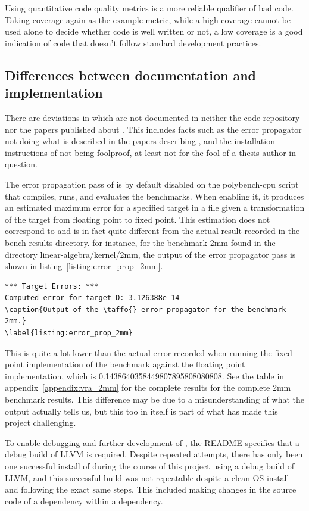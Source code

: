 Using quantitative code quality metrics is a more reliable qualifier of bad code. Taking coverage again as the example metric, while a high coverage cannot be used alone to decide whether code is well written or not, a low coverage is a good indication of code that doesn't follow standard development practices.  


\subsection{Differences between documentation and implementation}

There are deviations in \taffo{} which are not documented in neither the code repository nor the papers published about \taffo{}. 
This includes facts such as the error propagator not doing what is described in the papers describing \taffo{},  and the installation instructions of \taffo{} not being foolproof, at least not for the fool of a thesis author in question.

The error propagation pass of \taffo{} is by default disabled on the polybench-cpu script that compiles, runs, and evaluates the benchmarks. When enabling it, it produces an estimated maximum error for a specified target in a file given a transformation of the target from floating point to fixed point. This estimation does not correspond to and is in fact quite different from the actual result recorded in the bench-results directory. for instance, for the benchmark 2mm found in the directory linear-algebra/kernel/2mm, the output of the error propagator pass is shown in listing~\ref{listing:error_prop_2mm}.

\begin{lstlisting}
*** Target Errors: ***
Computed error for target D: 3.126388e-14
\caption{Output of the \taffo{} error propagator for the benchmark 2mm.}
\label{listing:error_prop_2mm}
\end{lstlisting}

This is quite a lot lower than the actual error recorded when running the fixed point implementation of the benchmark against the floating point implementation, which is 0.1438640358449807895808080808. See the table in appendix~\ref{appendix:vra_2mm} for the complete results for the complete 2mm benchmark results. This difference may be due to a misunderstanding of what the output actually tells us, but this too in itself is part of what has made this project challenging.

To enable debugging and further development of \taffo{}, the README specifies that a debug build of LLVM is required. Despite repeated attempts, there has only been one successful install of \taffo{} during the course of this project using a debug build of LLVM, and this successful build was not repeatable despite a clean OS install and following the exact same steps. This included making changes in the source code of a dependency within a \taffo{} dependency.  

